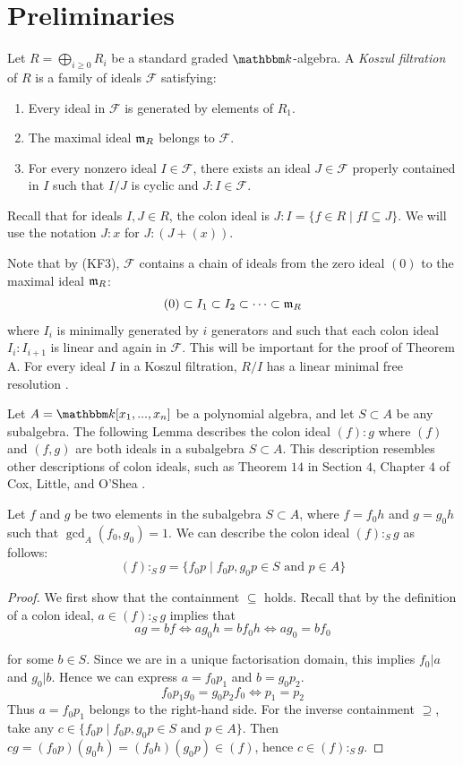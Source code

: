 \section{Preliminaries}
\noindent
Let $R=\bigoplus_{i\geq 0}R_i$ be a standard graded $\K$-algebra. A \emph{Koszul filtration} of $R$ is a family of ideals $\mathcal{F}$ satisfying:
\begin{enumerate}
    \item[\tagKFlin] Every ideal in $\mathcal{F}$ is generated by elements of $R_1$.
    \item[\tagKFmax] The maximal ideal $\mathfrak{m}_R$ belongs to $\mathcal{F}$.
    \item[\tagKFcol] For every nonzero ideal $I\in \mathcal{F}$, there exists an ideal $J\in \mathcal{F}$ properly contained in $I$ such that $I/J$ is cyclic and $J:I\in \mathcal{F}$.
\end{enumerate}
Recall that for ideals $I,J \in R$, the colon ideal is $J:I=\{f\in R \mid fI \subseteq J\}$. We will use the notation $J:x$ for $J:(J+(x))$.

Note that by (KF3), $\mathcal{F}$ contains a chain of ideals from the zero ideal $(0)$ to the maximal ideal $\mathfrak{m}_R$: 
$$(0)\subset I_1 \subset I_2\subset\dots\subset\mathfrak{m}_R$$
\noindent
where $I_i$ is minimally generated by $i$ generators and such that each colon ideal $I_i:I_{i+1}$ is linear and again in $\mathcal{F}$. This will be important for the proof of Theorem A. For every ideal $I$ in a Koszul filtration, $R/I$ has a linear minimal free resolution \cite{conca2012koszulalgebrasregularity}.

Let $A=\K [x_1,...,x_n]$ be a polynomial algebra, and let $S\subset A$ be any subalgebra. The following Lemma describes the colon ideal $(f):g$ where $(f)$ and $(f,g)$ are both ideals in a subalgebra $S\subset A$. This description resembles other descriptions of colon ideals, such as Theorem $14$ in Section $4$, Chapter $4$ of Cox, Little, and O'Shea \cite{cox2015ideals}.

\begin{lem}\label{coli}
 Let $f$ and $g$ be two elements in the subalgebra $S\subset A$, where $f=f_0h$ and $g=g_0h$ such that $\gcd_A(f_0,g_0)=1$. We can describe the colon ideal $(f):_Sg$ as follows:
    $$(f):_Sg=\{f_0p\mid f_0p, g_0p \in S \text{ and } p\in A\}$$
\end{lem}
\begin{proof}
We first show that the containment $\subseteq$ holds. Recall that by the definition of a colon ideal, $a\in (f):_Sg$ implies that 
$$ag=bf \Longleftrightarrow ag_0h=bf_0h\Longleftrightarrow ag_0=bf_0$$

\noindent
for some $b\in S$. Since we are in a unique factorisation domain, this implies $f_0|a$ and $g_0|b$. Hence we can express $a=f_0p_1$ and $b=g_0p_2$.
$$f_0p_1g_0=g_0p_2f_0\Longleftrightarrow p_1=p_2$$
\noindent
Thus $a=f_0p_1$ belongs to the right-hand side. For the inverse containment $\supseteq$, take any 
$ c \in \{f_0p\mid f_0p, g_0p \in S \text{ and } p\in A\}$. Then $cg=(f_0p)(g_0h)=(f_0h)(g_0p) \in (f)$, hence $c\in (f):_Sg$.

    
\end{proof}
